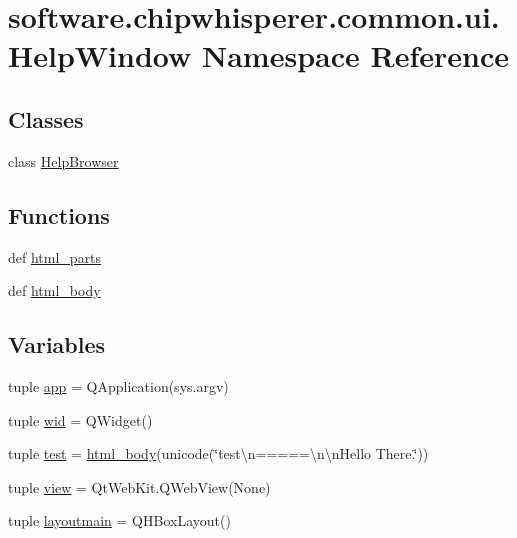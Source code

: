 \hypertarget{namespacesoftware_1_1chipwhisperer_1_1common_1_1ui_1_1HelpWindow}{}\section{software.\+chipwhisperer.\+common.\+ui.\+Help\+Window Namespace Reference}
\label{namespacesoftware_1_1chipwhisperer_1_1common_1_1ui_1_1HelpWindow}
\subsection*{Classes}
\begin{DoxyCompactItemize}
\item 
class \hyperlink{classsoftware_1_1chipwhisperer_1_1common_1_1ui_1_1HelpWindow_1_1HelpBrowser}{Help\+Browser}
\end{DoxyCompactItemize}
\subsection*{Functions}
\begin{DoxyCompactItemize}
\item 
def \hyperlink{namespacesoftware_1_1chipwhisperer_1_1common_1_1ui_1_1HelpWindow_a428e7cdcc49b6cdd98dc61d9218952e6}{html\+\_\+parts}
\item 
def \hyperlink{namespacesoftware_1_1chipwhisperer_1_1common_1_1ui_1_1HelpWindow_aab735445677633db6506bff6e4a2d733}{html\+\_\+body}
\end{DoxyCompactItemize}
\subsection*{Variables}
\begin{DoxyCompactItemize}
\item 
tuple \hyperlink{namespacesoftware_1_1chipwhisperer_1_1common_1_1ui_1_1HelpWindow_aa332a61a44fd34a5b42551efb342cc0c}{app} = Q\+Application(sys.\+argv)
\item 
tuple \hyperlink{namespacesoftware_1_1chipwhisperer_1_1common_1_1ui_1_1HelpWindow_a5facd763a64693533133ce0867f8e297}{wid} = Q\+Widget()
\item 
tuple \hyperlink{namespacesoftware_1_1chipwhisperer_1_1common_1_1ui_1_1HelpWindow_a6b7e91449c35dc76ffa124f92fbd5265}{test} = \hyperlink{namespacesoftware_1_1chipwhisperer_1_1common_1_1ui_1_1HelpWindow_aab735445677633db6506bff6e4a2d733}{html\+\_\+body}(unicode(\char`\"{}test\textbackslash{}n=====\textbackslash{}n\textbackslash{}n\+Hello There.\char`\"{}))
\item 
tuple \hyperlink{namespacesoftware_1_1chipwhisperer_1_1common_1_1ui_1_1HelpWindow_a089170c473735215005185584cf7b156}{view} = Qt\+Web\+Kit.\+Q\+Web\+View(None)
\item 
tuple \hyperlink{namespacesoftware_1_1chipwhisperer_1_1common_1_1ui_1_1HelpWindow_af78b8102e9200cb5b721f55f81f81561}{layoutmain} = Q\+H\+Box\+Layout()
\end{DoxyCompactItemize}



